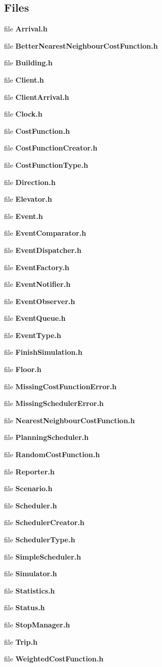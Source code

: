 \subsection*{Files}
\begin{DoxyCompactItemize}
\item 
file {\bf Arrival.\+h}
\item 
file {\bf Better\+Nearest\+Neighbour\+Cost\+Function.\+h}
\item 
file {\bf Building.\+h}
\item 
file {\bf Client.\+h}
\item 
file {\bf Client\+Arrival.\+h}
\item 
file {\bf Clock.\+h}
\item 
file {\bf Cost\+Function.\+h}
\item 
file {\bf Cost\+Function\+Creator.\+h}
\item 
file {\bf Cost\+Function\+Type.\+h}
\item 
file {\bf Direction.\+h}
\item 
file {\bf Elevator.\+h}
\item 
file {\bf Event.\+h}
\item 
file {\bf Event\+Comparator.\+h}
\item 
file {\bf Event\+Dispatcher.\+h}
\item 
file {\bf Event\+Factory.\+h}
\item 
file {\bf Event\+Notifier.\+h}
\item 
file {\bf Event\+Observer.\+h}
\item 
file {\bf Event\+Queue.\+h}
\item 
file {\bf Event\+Type.\+h}
\item 
file {\bf Finish\+Simulation.\+h}
\item 
file {\bf Floor.\+h}
\item 
file {\bf Missing\+Cost\+Function\+Error.\+h}
\item 
file {\bf Missing\+Scheduler\+Error.\+h}
\item 
file {\bf Nearest\+Neighbour\+Cost\+Function.\+h}
\item 
file {\bf Planning\+Scheduler.\+h}
\item 
file {\bf Random\+Cost\+Function.\+h}
\item 
file {\bf Reporter.\+h}
\item 
file {\bf Scenario.\+h}
\item 
file {\bf Scheduler.\+h}
\item 
file {\bf Scheduler\+Creator.\+h}
\item 
file {\bf Scheduler\+Type.\+h}
\item 
file {\bf Simple\+Scheduler.\+h}
\item 
file {\bf Simulator.\+h}
\item 
file {\bf Statistics.\+h}
\item 
file {\bf Status.\+h}
\item 
file {\bf Stop\+Manager.\+h}
\item 
file {\bf Trip.\+h}
\item 
file {\bf Weighted\+Cost\+Function.\+h}
\end{DoxyCompactItemize}
